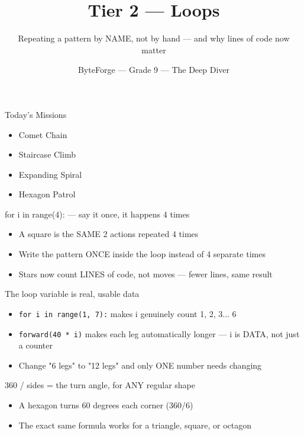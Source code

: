 \documentclass[aspectratio=169]{beamer}
\title{Tier 2 — Loops}
\subtitle{Repeating a pattern by NAME, not by hand --- and why lines of code now matter}
\author{ByteForge --- Grade 9 --- The Deep Diver}
\date{}
\begin{document}
\begin{frame}
    \titlepage
\end{frame}

\begin{frame}{Today's Missions}
    \Large
    \begin{itemize}
        \item Comet Chain
        \item Staircase Climb
        \item Expanding Spiral
        \item Hexagon Patrol
    \end{itemize}
\end{frame}

\begin{frame}{for i in range(4): --- say it once, it happens 4 times}
    \large
    \begin{itemize}
        \item A square is the SAME 2 actions repeated 4 times
        \item Write the pattern ONCE inside the loop instead of 4 separate times
        \item Stars now count LINES of code, not moves --- fewer lines, same result
    \end{itemize}
\end{frame}


\begin{frame}{The loop variable is real, usable data}
    \large
    \begin{itemize}
        \item \texttt{for i in range(1, 7):} makes i genuinely count 1, 2, 3... 6
        \item \texttt{forward(40 * i)} makes each leg automatically longer --- i is DATA, not just a counter
        \item Change "6 legs" to "12 legs" and only ONE number needs changing
    \end{itemize}
\end{frame}


\begin{frame}{360 / sides = the turn angle, for ANY regular shape}
    \large
    \begin{itemize}
        \item A hexagon turns 60 degrees each corner (360/6)
        \item The exact same formula works for a triangle, square, or octagon
    \end{itemize}
\end{frame}
\end{document}
